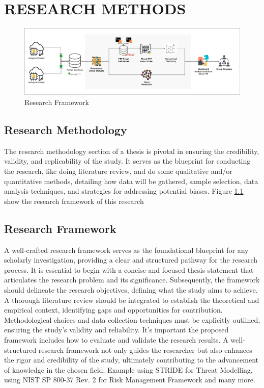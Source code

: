 \chapter{RESEARCH METHODS}

\begin{figure}[htbp]
	\centering \includegraphics[width=1.0\textwidth]{images/framework.png}
	\caption{Research Framework}
	\label{fig:framework}
\end{figure} 

\section{Research Methodology}
The research methodology section of a thesis is pivotal in ensuring the credibility, validity, and replicability of the study. It serves as the blueprint for conducting the research, like doing literature review, and do some qualitative and/or quantitative methods, detailing how data will be gathered, sample selection, data analysis techniques, and strategies for addressing potential biases. Figure \ref{fig:framework} show the research framework of this research

\section{Research Framework}
A well-crafted research framework serves as the foundational blueprint for any scholarly investigation, providing a clear and structured pathway for the research process. It is essential to begin with a concise and focused thesis statement that articulates the research problem and its significance. Subsequently, the framework should delineate the research objectives, defining what the study aims to achieve. A thorough literature review should be integrated to establish the theoretical and empirical context, identifying gaps and opportunities for contribution. Methodological choices and data collection techniques must be explicitly outlined, ensuring the study's validity and reliability. It’s important the proposed framework includes how to evaluate and validate the research results. A well-structured research framework not only guides the researcher but also enhances the rigor and credibility of the study, ultimately contributing to the advancement of knowledge in the chosen field. Example using STRIDE for Threat Modelling, using NIST SP 800-37 Rev. 2 for Risk Management Framework and many more. 